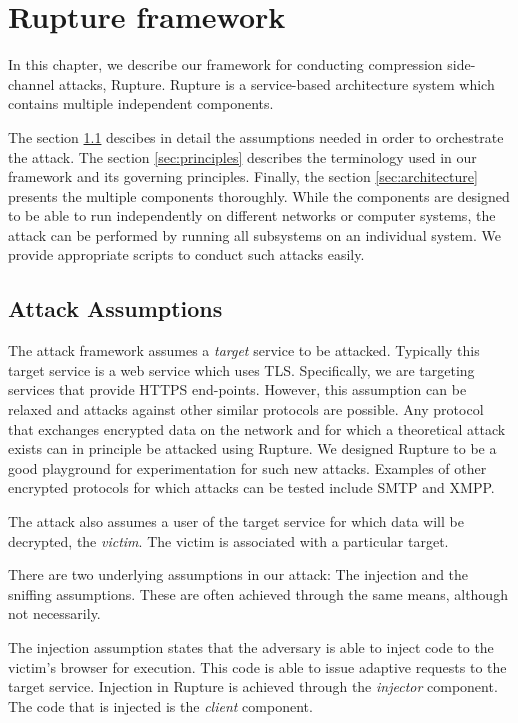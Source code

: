 \chapter{Rupture framework}\label{rupture}

In this chapter, we describe our framework for conducting compression side-channel attacks,
Rupture. Rupture\cite{rupture} is a service-based architecture system which contains multiple
independent components.

The section \ref{sec:assumptions} descibes in detail the assumptions needed 
in order to orchestrate the attack. The section \ref{sec:principles} describes the 
terminology used in our framework and its governing principles. Finally, the section
\ref{sec:architecture} presents the multiple components thoroughly.
While the components are designed to be able to run
independently on different networks or computer systems, the
attack can be performed by running all subsystems on an individual system. We
provide appropriate scripts to conduct such attacks easily.


\section{Attack Assumptions}\label{sec:assumptions}

The attack framework assumes a \textit{target} service to be attacked. Typically
this target service is a web service which uses TLS. Specifically, we are
targeting services that provide HTTPS end-points. However, this assumption can
be relaxed and attacks against other similar protocols are possible. Any
protocol that exchanges encrypted data on the network and for which a
theoretical attack exists can in principle be attacked using Rupture. We
designed Rupture to be a good playground for experimentation for such new
attacks. Examples of other encrypted protocols for which attacks can be tested
include SMTP and XMPP.

The attack also assumes a user of the target service for which data will be
decrypted, the \textit{victim}. The victim is associated with a particular target.

There are two underlying assumptions in our attack: The injection and the
sniffing assumptions. These are often achieved through the same means, although
not necessarily.

The injection assumption states that the adversary is able to
inject code to the victim's browser for execution. This code is able to issue
adaptive requests to the target service. Injection in Rupture is achieved
through the \textit{injector} component. The code that is injected is the \textit{client}
component.

